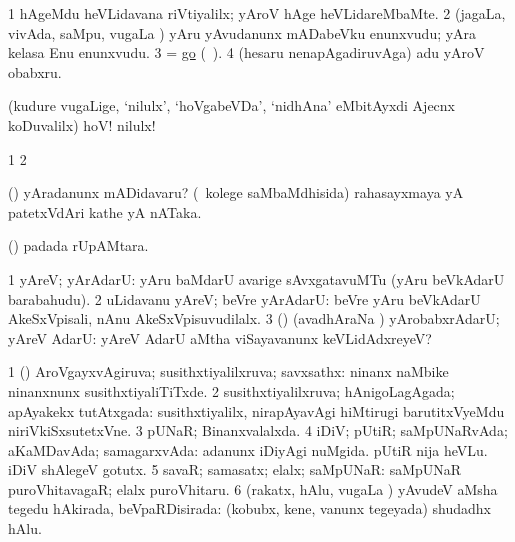 \noindent 
\gl{\pagu}
\bmng
\bnum
\num{1}  hAgeMdu heVLidavana riVtiyalilx; yAroV hAge heVLidareMbaMte. 
\num{2}    (jagaLa, vivAda, saMpu, \mo vugaLa \vi) yAru yAvudanunx mADabeVku enunxvudu; yAra kelasa Enu enunxvudu. 
\num{3}  = \hyperref{kandict_g.pdf}{G}{gopagu67}{go} (\pagu\ ). 
\num{4}  (hesaru nenapAgadiruvAga) adu yAroV obabxru. 
\enum
\emng
\eentry

\bentry
{}
\gl{\BAavayx}
\bmng
(kudure \mo vugaLige, `nilulx', `hoVgabeVDa', `nidhAna' eMbitAyxdi Ajecnx koDuvalilx) hoV! nilulx! 
\emng
\eentry

\bentry
{}
\gl{\saMkiSx}
\bmng
\bnum
\num{1}  
\num{2}  
\enum
\emng
\eentry

\bentry
{}
\gl{\nA}
\bmng
(\AmA) yAradanunx mADidavaru? (\kanmu\ kolege saMbaMdhisida) rahasayxmaya yA patetxVdAri kathe yA nATaka. 
\emng
\eentry

\bentry
{}
\gl{\sanA}
\bmng
(\kAparx)  padada rUpAMtara. 
\emng
\eentry

\bentry
{} 
\gl{\sanA}
\expl{}
\bmng
\bnum
\num{1} yAreV; yArAdarU:  yAru baMdarU avarige sAvxgatavuMTu (yAru beVkAdarU barabahudu). 
\num{2} uLidavanu yAreV; beVre yArAdarU:  beVre yAru beVkAdarU AkeSxVpisali, nAnu AkeSxVpisuvudilalx. 
\num{3} (\AmA) (avadhAraNa \parx) yArobabxrAdarU; yAreV AdarU:  yAreV AdarU aMtha viSayavanunx keVLidAdxreyeV? 
\enum
\emng
\eentry

\bentry
{} 
\gl{\gu}
\expl{}
\bmng
\bnum
\num{1} (\pArxparx) AroVgayxvAgiruva; susithxtiyalilxruva; savxsathx:  ninanx naMbike ninanxnunx susithxtiyaliTiTxde. 
\num{2} susithxtiyalilxruva; hAnigoLagAgada; apAyakekx tutAtxgada:  susithxtiyalilx, nirapAyavAgi hiMtirugi barutitxVyeMdu niriVkiSxsutetxVne. 
\num{3} pUNaR; Binanxvalalxda. 
\num{4} iDiV; pUtiR; saMpUNaRvAda; aKaMDavAda; samagarxvAda:  adanunx iDiyAgi nuMgida.  pUtiR nija heVLu.  iDiV shAlegeV gotutx. 
\num{5} savaR; samasatx; elalx; saMpUNaR:  saMpUNaR puroVhitavagaR; elalx puroVhitaru. 
\num{6} (rakatx, hAlu, \mo vugaLa \vi) yAvudeV aMsha tegedu hAkirada, beVpaRDisirada:  (kobubx, kene, \mo vanunx tegeyada) shudadhx hAlu. 
\enum
\emng

